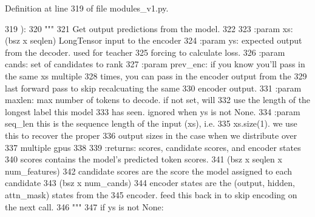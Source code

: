 Definition at line 319 of file modules\+\_\+v1.\+py.


\begin{DoxyCode}
319     ):
320         \textcolor{stringliteral}{"""}
321 \textcolor{stringliteral}{        Get output predictions from the model.}
322 \textcolor{stringliteral}{}
323 \textcolor{stringliteral}{        :param xs:          (bsz x seqlen) LongTensor input to the encoder}
324 \textcolor{stringliteral}{        :param ys:          expected output from the decoder. used for teacher}
325 \textcolor{stringliteral}{                            forcing to calculate loss.}
326 \textcolor{stringliteral}{        :param cands:       set of candidates to rank}
327 \textcolor{stringliteral}{        :param prev\_enc:    if you know you'll pass in the same xs multiple}
328 \textcolor{stringliteral}{                            times, you can pass in the encoder output from the}
329 \textcolor{stringliteral}{                            last forward pass to skip recalcuating the same}
330 \textcolor{stringliteral}{                            encoder output.}
331 \textcolor{stringliteral}{        :param maxlen:      max number of tokens to decode. if not set, will}
332 \textcolor{stringliteral}{                            use the length of the longest label this model}
333 \textcolor{stringliteral}{                            has seen. ignored when ys is not None.}
334 \textcolor{stringliteral}{        :param seq\_len      this is the sequence length of the input (xs), i.e.}
335 \textcolor{stringliteral}{                            xs.size(1). we use this to recover the proper}
336 \textcolor{stringliteral}{                            output sizes in the case when we distribute over}
337 \textcolor{stringliteral}{                            multiple gpus}
338 \textcolor{stringliteral}{}
339 \textcolor{stringliteral}{        :returns: scores, candidate scores, and encoder states}
340 \textcolor{stringliteral}{            scores contains the model's predicted token scores.}
341 \textcolor{stringliteral}{                (bsz x seqlen x num\_features)}
342 \textcolor{stringliteral}{            candidate scores are the score the model assigned to each candidate}
343 \textcolor{stringliteral}{                (bsz x num\_cands)}
344 \textcolor{stringliteral}{            encoder states are the (output, hidden, attn\_mask) states from the}
345 \textcolor{stringliteral}{                encoder. feed this back in to skip encoding on the next call.}
346 \textcolor{stringliteral}{        """}
347         \textcolor{keywordflow}{if} ys \textcolor{keywordflow}{is} \textcolor{keywordflow}{not} \textcolor{keywordtype}{None}:

\end{DoxyCode}
